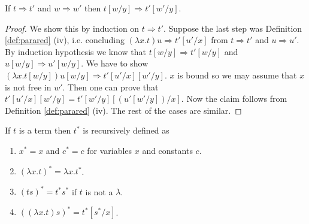 \begin{boxlem} \label{lem:arrowsubst}
    If $t \Rightarrow t'$ and $w \Rightarrow w'$ then $t[w/y] \Rightarrow t'[w'/y]$.
\end{boxlem}
\begin{proof}
    We show this by induction on $t \Rightarrow t'$.
    Suppose the last step was Definition \ref{def:parared} (iv), i.e. concluding $(\lambda x.t)u \Rightarrow t'[u'/x]$ from $t \Rightarrow t'$ and $u \Rightarrow u'$.
    By induction hypothesis we know that $t[w/y] \Rightarrow t'[w/y]$ and $u[w /y] \Rightarrow u'[w/y]$.
    We have to show $(\lambda x.t [w/y])u[w/y] \Rightarrow t'[u'/x][w'/y]$.
    $x$ is bound so we may assume that $x$ is not free in $w'$.
    Then one can prove that $t'[u'/x][w'/y] = t'[w'/y][(u'[w'/y])/x]$.
    Now the claim follows from Definition \ref{def:parared} (iv).
    The rest of the cases are similar.
\end{proof}

\begin{boxdefi} \label{def:star}
    If $t$ is a term then \alert{$t^*$} is recursively defined as
    \begin{enumerate}
        \item $x^* = x$ and $c^* = c$ for variables $x$ and constants $c$.
        \item $(\lambda x.t)^* = \lambda x. t^*$.
        \item $(ts)^* = t^*s^*$ if $t$ is not a $\lambda$.
        \item $((\lambda x.t) s)^* = t^*[s^*/x]$.
    \end{enumerate}
\end{boxdefi}

